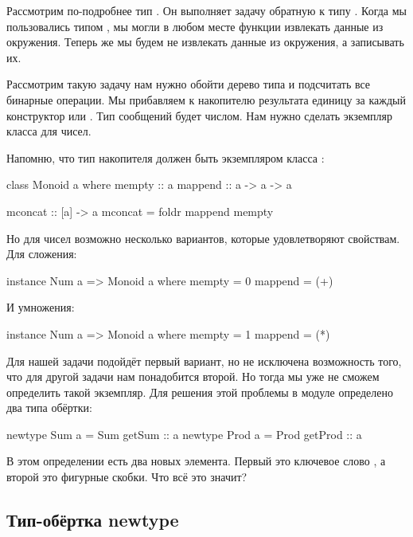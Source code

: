 Рассмотрим по-подробнее тип . Он выполняет задачу обратную к
типу . Когда мы пользовались типом , мы могли в
любом месте функции извлекать данные из окружения. Теперь же мы будем не
извлекать данные из окружения, а записывать их.

Рассмотрим такую задачу нам нужно обойти дерево типа  и
подсчитать все бинарные операции. Мы прибавляем к накопителю результата
единицу за каждый конструктор  или . Тип сообщений будет
числом. Нам нужно сделать экземпляр класса  для чисел.

Напомню, что тип накопителя должен быть экземпляром класса :


\begin{code}
class Monoid a where
    mempty  :: a
    mappend :: a -> a -> a

    mconcat :: [a] -> a
    mconcat = foldr mappend mempty
\end{code}

Но для чисел возможно несколько вариантов, которые удовлетворяют
свойствам. Для сложения:


\begin{code}
instance Num a => Monoid a where
    mempty  = 0
    mappend = (+)
\end{code}

И умножения:


\begin{code}
instance Num a => Monoid a where
    mempty  = 1
    mappend = (*)
\end{code}

Для нашей задачи подойдёт первый вариант, но не исключена возможность
того, что для другой задачи нам понадобится второй. Но тогда мы уже не
сможем определить такой экземпляр. Для решения этой проблемы в модуле
 определено два типа обёртки:


\begin{code}
newtype Sum  a = Sum  { getSum  :: a }
newtype Prod a = Prod { getProd :: a }
\end{code}

В этом определении есть два новых элемента. Первый это ключевое слово
 , а второй это фигурные скобки. Что всё
это значит?

\subsection{Тип-обёртка newtype}


